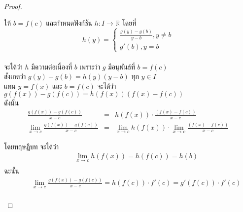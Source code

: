 \documentclass[12pt, a4paper]{article}
\begin{document}
\begin{enumerate}
    \begin{proof}
        \begin{enumerate} ให้ $b=f\left ( c \right )$ และกำหนดฟังก์ชัน $h: I\rightarrow \mathbb{R}$ โดยที่ \\
        \hspace{4cm} $$ h(y)=\left\{\begin{matrix}
            \frac{g(y)-g(b)}{y-b} ,y\neq b\\ 
            g'\left ( b \right ) ,y=b
            \end{matrix}\right.$$\\
        \hspace{1cm}จะได้ว่า  $h$ มีความต่อเนื่องที่ $b$ เพราะว่า $g$ มีอนุพันธ์ที่ $b=f\left ( c \right )$ \\
        สังเกตว่า $g(y)-g(b)=h(y)(y-b)$ ทุก $y\in I$\\
        แทน $y=f\left ( x \right )$ และ $b=f\left ( c \right )$ จะได้ว่า $g\left ( f\left ( x \right ) \right )-g\left ( f\left ( c \right ) \right )=h\left ( f(x) \right ) \left ( f\left ( x \right ) -f\left ( c \right )\right )$\\
        ดังนั้น    \begin{eqnarray*}
            \frac{g\left ( f\left ( x \right ) \right )-g\left ( f\left ( c \right ) \right )}{x-c}    &=&   h\left ( f(x) \right ) \cdot   \frac{ \left ( f\left ( x \right ) -f\left ( c \right )\right )}{x-c}\\
            \lim_{x\rightarrow c}\frac{g\left ( f\left ( x \right ) \right )-g\left ( f\left ( c \right ) \right )}{x-c}  &=&\lim_{x\rightarrow c}   h\left ( f(x) \right ) \cdot \lim_{x\rightarrow c}  \frac{ \left ( f\left ( x \right ) -f\left ( c \right )\right )}{x-c}
                \end{eqnarray*}

        โดยทฤษฎีบท จะได้ว่า
        \begin{eqnarray*}\hspace{1cm}
         \lim_{x\rightarrow c}h\left ( f\left ( x \right ) \right )=h\left ( f\left ( c \right ) \right )=h\left ( b \right )\\
        \end{eqnarray*}
         ฉะนั้น \begin{eqnarray*}\hspace{1cm}   \lim_{x\rightarrow c}\frac{g\left ( f\left ( x \right ) \right )-g\left ( f\left ( c \right ) \right )}{x-c}  =h\left ( f\left ( c \right ) \right )\cdot{ f}'\left ( c \right )={g}'\left ( f\left ( c \right ) \right )\cdot {f}'\left ( c \right )\\
        \end{eqnarray*}


\end{enumerate}
\end{proof}
\end{enumerate}
\end{document}
